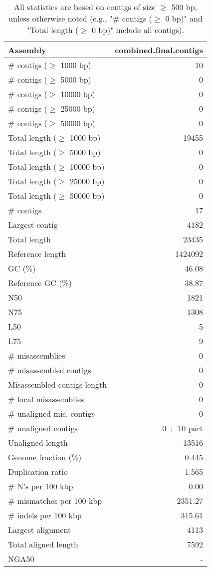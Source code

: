 \documentclass[12pt,a4paper]{article}
\begin{document}
\begin{table}[ht]
\begin{center}
\caption{All statistics are based on contigs of size $\geq$ 500 bp, unless otherwise noted (e.g., "\# contigs ($\geq$ 0 bp)" and "Total length ($\geq$ 0 bp)" include all contigs).}
\begin{tabular}{|l*{1}{|r}|}
\hline
Assembly & combined.final.contigs \\ \hline
\# contigs ($\geq$ 1000 bp) & 10 \\ \hline
\# contigs ($\geq$ 5000 bp) & 0 \\ \hline
\# contigs ($\geq$ 10000 bp) & 0 \\ \hline
\# contigs ($\geq$ 25000 bp) & 0 \\ \hline
\# contigs ($\geq$ 50000 bp) & 0 \\ \hline
Total length ($\geq$ 1000 bp) & 19455 \\ \hline
Total length ($\geq$ 5000 bp) & 0 \\ \hline
Total length ($\geq$ 10000 bp) & 0 \\ \hline
Total length ($\geq$ 25000 bp) & 0 \\ \hline
Total length ($\geq$ 50000 bp) & 0 \\ \hline
\# contigs & 17 \\ \hline
Largest contig & 4182 \\ \hline
Total length & 23435 \\ \hline
Reference length & 1424092 \\ \hline
GC (\%) & 46.08 \\ \hline
Reference GC (\%) & 38.87 \\ \hline
N50 & 1821 \\ \hline
N75 & 1308 \\ \hline
L50 & 5 \\ \hline
L75 & 9 \\ \hline
\# misassemblies & 0 \\ \hline
\# misassembled contigs & 0 \\ \hline
Misassembled contigs length & 0 \\ \hline
\# local misassemblies & 0 \\ \hline
\# unaligned mis. contigs & 0 \\ \hline
\# unaligned contigs & 0 + 10 part \\ \hline
Unaligned length & 13516 \\ \hline
Genome fraction (\%) & 0.445 \\ \hline
Duplication ratio & 1.565 \\ \hline
\# N's per 100 kbp & 0.00 \\ \hline
\# mismatches per 100 kbp & 2351.27 \\ \hline
\# indels per 100 kbp & 315.61 \\ \hline
Largest alignment & 4113 \\ \hline
Total aligned length & 7592 \\ \hline
NGA50 & - \\ \hline
\end{tabular}
\end{center}
\end{table}
\end{document}
